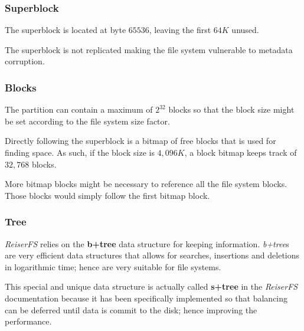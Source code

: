 
\begin{frame}
  \frametitle{Superblock}

  The superblock is located at byte $65536$, leaving the first $64K$ unused.

  \-

  The superblock is not replicated making the file system vulnerable to
  metadata corruption.
\end{frame}


\begin{frame}
  \frametitle{Blocks}

  The partition can contain a maximum of $2^{32}$ blocks so that the
  block size might be set according to the file system size factor.

  \-

  Directly following the superblock is a bitmap of free blocks that is used
  for finding space. As such, if the block size is $4,096K$, a block bitmap
  keeps track of $32,768$ blocks.

  \-

  More bitmap blocks might be necessary to reference all the file system
  blocks. Those blocks would simply follow the first bitmap block.
\end{frame}


\begin{frame}
  \frametitle{Tree}

  \textit{ReiserFS} relies on the \textbf{b+tree} data structure for keeping
  information. \textit{b+tree}s are very efficient data structures that allows
  for searches, insertions and deletions in logarithmic time; hence are very
  suitable for file systems.

  \-

  This special and unique data structure is actually called \textbf{s+tree}
  in the \textit{ReiserFS} documentation because it has been specifically
  implemented so that balancing can be deferred until data is commit to the
  disk; hence improving the performance.
\end{frame}



